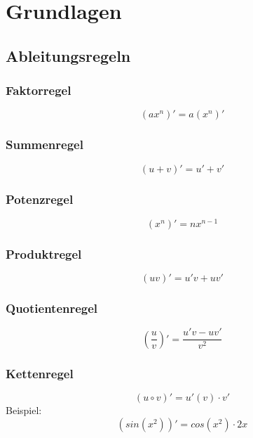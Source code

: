 
\section{Grundlagen} 
\label{sec:grundlagen}

\subsection{Ableitungsregeln} 
\label{sub:ableitungsregeln}

\subsubsection{Faktorregel}
\label{ssub:faktorregel}
\begin{equation}
	(ax^n)' = a(x^n)' 
\end{equation}	

\subsubsection{Summenregel}
\label{ssub:summenregel}
\begin{equation}
	(u+v)' = u' + v' 
\end{equation}	

\subsubsection{Potenzregel}
\label{ssub:potenzregel}
\begin{equation}
	(x^n)' = nx^{n-1} 
\end{equation}

\subsubsection{Produktregel}
\label{ssub:produktregel}
\begin{equation}
	(uv)' = u'v + uv'
\end{equation}	

\subsubsection{Quotientenregel}
\label{ssub:quotientenregel}
\begin{equation}
	\left(\frac{u}{v}\right)' = \frac{u'v - uv'}{v^2}
\end{equation}

\subsubsection{Kettenregel}
\label{ssub:kettenregel}
\begin{equation}
	(u \circ v)' = u'(v) \cdot v'
\end{equation}
Beispiel:
\begin{displaymath}
	(sin(x^2))' = cos(x^2) \cdot 2x
\end{displaymath}

